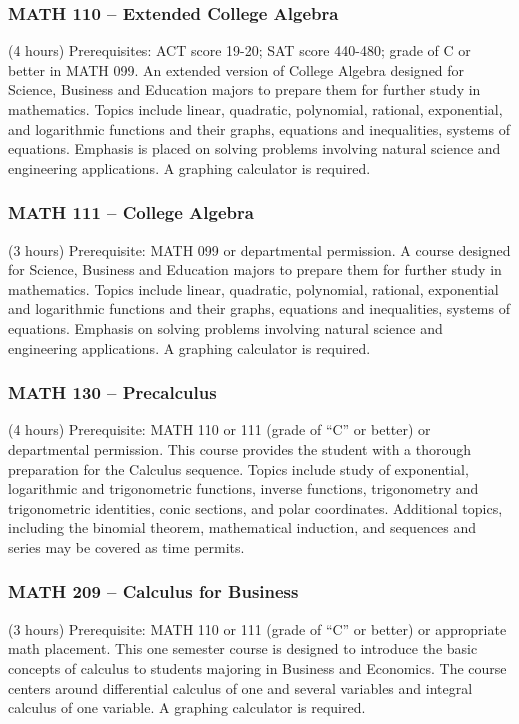 \subsubsection{MATH 110 -- Extended College Algebra}
(4 hours) Prerequisites: ACT score 19-20; SAT score 440-480; grade of C or better in MATH 099. An extended version of College Algebra designed for Science, Business and Education majors to prepare them for further study in mathematics. Topics include linear, quadratic, polynomial, rational, exponential, and logarithmic functions and their graphs, equations and inequalities, systems of equations. Emphasis is placed on solving problems involving natural science and engineering applications. A graphing calculator is required.

\subsubsection{MATH 111 -- College Algebra}
(3 hours) Prerequisite: MATH 099 or departmental permission. A course designed for Science, Business and Education majors to prepare them for further study in mathematics. Topics include linear, quadratic, polynomial, rational, exponential and logarithmic functions and their graphs, equations and inequalities, systems of equations. Emphasis on solving problems involving natural science and engineering applications. A graphing calculator is required.

\subsubsection{MATH 130 -- Precalculus}
(4 hours) Prerequisite: MATH 110 or 111 (grade of “C” or better) or departmental permission. This course provides the student with a thorough preparation for the Calculus sequence. Topics include study of exponential, logarithmic and trigonometric functions, inverse functions, trigonometry and trigonometric identities, conic sections, and polar coordinates. Additional topics, including the binomial theorem, mathematical induction, and sequences and series may be covered as time permits.

\subsubsection{MATH 209 -- Calculus for Business}
(3 hours) Prerequisite: MATH 110 or 111 (grade of “C” or better) or appropriate math placement. This one semester course is designed to introduce the basic concepts of calculus to students majoring in Business and Economics. The course centers around differential calculus of one and several variables and integral calculus of one variable. A graphing calculator is required.

